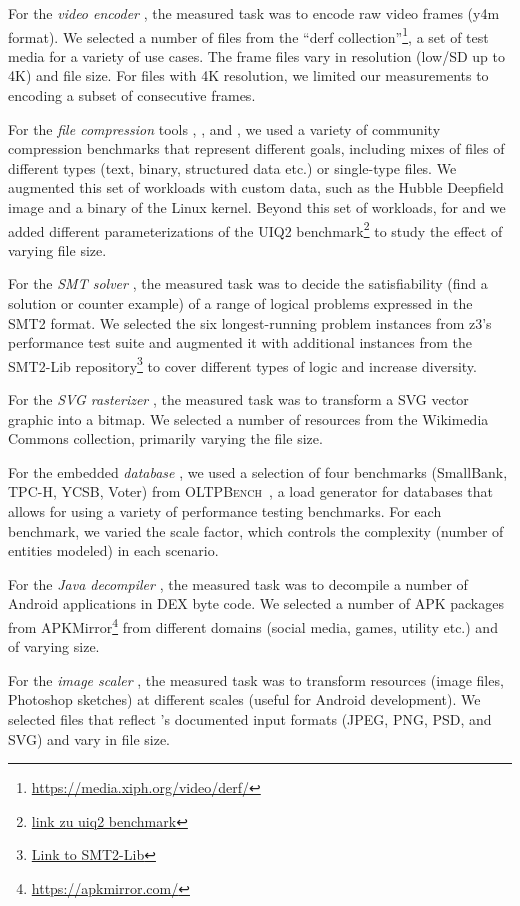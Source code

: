 For the \textit{video encoder} \xzwo, the measured task was to encode raw video frames (y4m format). We selected a number of files from the “derf collection”\footnote{\url{https://media.xiph.org/video/derf/}}, a set of test media for a variety of use cases. The frame files vary in resolution (low/SD up to 4K) and file size. For files with 4K resolution, we limited our measurements to encoding a subset of consecutive frames.

For the \textit{file compression} tools \kanzi, \xz, and \lrzip, we used a variety of community compression benchmarks that represent different goals, including mixes of files of different types (text, binary, structured data etc.) or single-type files. We augmented this set of workloads with custom data, such as the Hubble Deepfield image and a binary of the Linux kernel. Beyond this set of workloads, for \xz and \lrzip we added different parameterizations of the UIQ2 benchmark\footnote{\url{link zu uiq2 benchmark}} to study the effect of varying file size. 

For the \textit{SMT solver} \zdrei, the measured task was to decide the satisfiability (find a solution or counter example) of a range of logical problems expressed in the SMT2 format. We selected the six longest-running problem instances from z3’s performance test suite and augmented it with additional instances from the SMT2-Lib repository\footnote{\url{Link to SMT2-Lib}} to cover different types of logic and increase diversity.

For the \textit{SVG rasterizer} \batik, the measured task was to transform a SVG vector graphic into a bitmap. We selected a number of resources from the Wikimedia Commons collection, primarily varying the file size.

For the embedded \textit{database} \htwo, we used a selection of four benchmarks (SmallBank, TPC-H, YCSB, Voter) from \textsc{OLTPBench}~\cite{difallah_oltp_2013}, a load generator for databases that allows for using a variety of performance testing benchmarks. For each benchmark, we varied the scale factor, which controls the complexity (number of entities modeled) in each scenario.

For the \textit{Java decompiler} \jadx, the measured task was to decompile a number of Android applications in DEX byte code. We selected a number of APK packages from APKMirror\footnote{\url{https://apkmirror.com/}} from different domains (social media, games, utility etc.) and of varying size.

For the \textit{image scaler} \dconvert, the measured task was to transform resources (image files, Photoshop sketches) at different scales (useful for Android development). We selected files that reflect \dconvert's documented input formats (JPEG, PNG, PSD, and SVG) and vary in file size.


